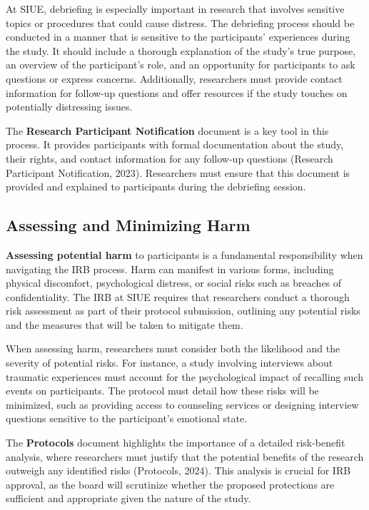 \documentclass[
]{book}
\begin{document}
At SIUE, debriefing is especially important in research that involves sensitive topics or procedures that could cause distress. The debriefing process should be conducted in a manner that is sensitive to the participants' experiences during the study. It should include a thorough explanation of the study's true purpose, an overview of the participant's role, and an opportunity for participants to ask questions or express concerns. Additionally, researchers must provide contact information for follow-up questions and offer resources if the study touches on potentially distressing issues.

The \textbf{Research Participant Notification} document is a key tool in this process. It provides participants with formal documentation about the study, their rights, and contact information for any follow-up questions (Research Participant Notification, 2023). Researchers must ensure that this document is provided and explained to participants during the debriefing session.

\subsection*{Assessing and Minimizing Harm}\label{assessing-and-minimizing-harm}

\textbf{Assessing potential harm} to participants is a fundamental responsibility when navigating the IRB process. Harm can manifest in various forms, including physical discomfort, psychological distress, or social risks such as breaches of confidentiality. The IRB at SIUE requires that researchers conduct a thorough risk assessment as part of their protocol submission, outlining any potential risks and the measures that will be taken to mitigate them.

When assessing harm, researchers must consider both the likelihood and the severity of potential risks. For instance, a study involving interviews about traumatic experiences must account for the psychological impact of recalling such events on participants. The protocol must detail how these risks will be minimized, such as providing access to counseling services or designing interview questions sensitive to the participant's emotional state.

The \textbf{Protocols} document highlights the importance of a detailed risk-benefit analysis, where researchers must justify that the potential benefits of the research outweigh any identified risks (Protocols, 2024). This analysis is crucial for IRB approval, as the board will scrutinize whether the proposed protections are sufficient and appropriate given the nature of the study.
\end{document}

